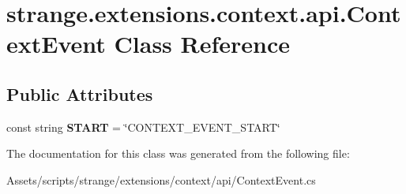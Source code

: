 \hypertarget{classstrange_1_1extensions_1_1context_1_1api_1_1_context_event}{\section{strange.\-extensions.\-context.\-api.\-Context\-Event Class Reference}
\label{classstrange_1_1extensions_1_1context_1_1api_1_1_context_event}
}
\subsection*{Public Attributes}
\begin{DoxyCompactItemize}
\item 
\hypertarget{classstrange_1_1extensions_1_1context_1_1api_1_1_context_event_a975d3f8049b057367ca0d0e95b2b3a43}{const string {\bfseries S\-T\-A\-R\-T} = \char`\"{}C\-O\-N\-T\-E\-X\-T\-\_\-\-E\-V\-E\-N\-T\-\_\-\-S\-T\-A\-R\-T\char`\"{}}\label{classstrange_1_1extensions_1_1context_1_1api_1_1_context_event_a975d3f8049b057367ca0d0e95b2b3a43}

\end{DoxyCompactItemize}


The documentation for this class was generated from the following file\-:\begin{DoxyCompactItemize}
\item 
Assets/scripts/strange/extensions/context/api/Context\-Event.\-cs\end{DoxyCompactItemize}
